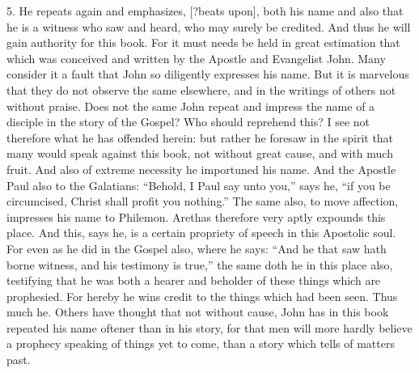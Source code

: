 5. He repeats again and emphasizes, [?beats upon], both his name and also that he is a witness who saw and heard, who may surely be credited. And thus he will gain authority for this book. For it must needs be held in great estimation that which was conceived and written by the Apostle and Evangelist John. Many consider it a fault that John so diligently expresses his name. But it is marvelous that they do not observe the same elsewhere, and in the writings of others not without praise. Does not the same John repeat and impress the name of a disciple in the story of the Gospel? Who should reprehend this? I see not therefore what he has offended herein: but rather he foresaw in the spirit that many would speak against this book, not without great cause, and with much fruit. And also of extreme necessity he importuned his name. And the Apostle Paul also to the Galatians: “Behold, I Paul say unto you,” says he, “if you be circumcised, Christ shall profit you nothing.” The same also, to move affection, impresses his name to Philemon. Arethas therefore very aptly expounds this place. And this, says he, is a certain propriety of speech in this Apostolic soul. For even as he did in the Gospel also, where he says: “And he that saw hath borne witness, and his testimony is true,” the same doth he in this place also, testifying that he was both a hearer and beholder of these things which are prophesied. For hereby he wins credit to the things which had been seen. Thus much he. Others have thought that not without cause, John has in this book repeated his name oftener than in his story, for that men will more hardly believe a prophecy speaking of things yet to come, than a story which tells of matters past.

